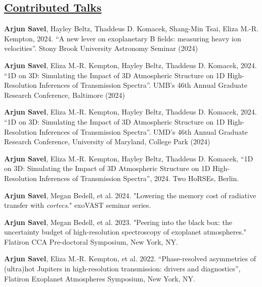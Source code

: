 \documentclass[letterpaper,10.5pt]{article}
\newcommand{\shortershorterSection}[1]{\vspace{-10pt}\subsection{#1}}
\begin{document}
\shortershorterSection{\underline{Contributed Talks}}

\small
  \begin{list}{}{\cvlist}

    \item[{\color{numcolor}\scriptsize14}] \textbf{Arjun Savel}, Hayley Beltz, Thaddeus D. Komacek, Shang-Min Tsai, Eliza M.-R. Kempton, 2024. ``A new lever on exoplanetary B fields: measuring heavy ion velocities''. Stony Brook University Astronomy Seminar (2024)

  \item[{\color{numcolor}\scriptsize13}] \textbf{Arjun Savel}, Eliza M.-R. Kempton, Hayley Beltz, Thaddeus D. Komacek, 2024. ``1D on 3D: Simulating the Impact of 3D Atmospheric Structure on 1D High-Resolution Inferences of Transmission Spectra''. UMB's 46th Annual Graduate Research Conference, Baltimore (2024)
  
    \item[{\color{numcolor}\scriptsize12}] \textbf{Arjun Savel},  Eliza M.-R. Kempton, Hayley Beltz, Thaddeus D. Komacek, 2024. ``1D on 3D: Simulating the Impact of 3D Atmospheric Structure on 1D High-Resolution Inferences of Transmission Spectra''. UMD's 46th Annual Graduate Research Conference, University of Maryland, College Park (2024)

    \item[{\color{numcolor}\scriptsize11}] \textbf{Arjun Savel},  Eliza M.-R. Kempton, Hayley Beltz, Thaddeus D. Komacek, ``1D on 3D: Simulating the Impact of 3D Atmospheric Structure on 1D High-Resolution Inferences of Transmission Spectra'', 2024. Two HoRSEs, Berlin.

  \item[{\color{numcolor}\scriptsize10}] \textbf{Arjun Savel}, Megan Bedell, et al. 2024. "Lowering the memory cost of radiative transfer with \textit{cortecs}." exoVAST seminar series.
  

  \item[{\color{numcolor}\scriptsize9}] \textbf{Arjun Savel}, Megan Bedell, et al. 2023. "Peering into the black box: 
the uncertainty budget of high-resolution spectroscopy of exoplanet atmospheres." Flatiron CCA Pre-doctoral Symposium, New York, NY.

 \item[{\color{numcolor}\scriptsize8}] \textbf{Arjun Savel}, Eliza M.-R. Kempton, et al. 2022. ``Phase-resolved asymmetries of (ultra)hot Jupiters in high-resolution transmission: drivers and diagnostics'', Flatiron Exoplanet Atmospheres Symposium, New York, NY.


\end{list}
\end{document}
